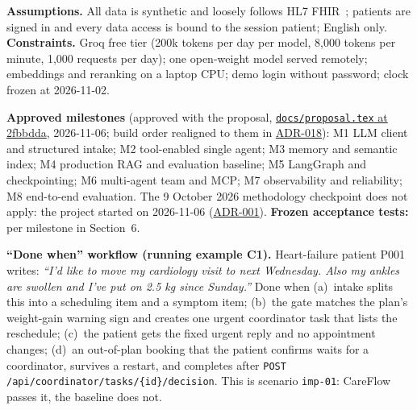 \documentclass[10pt,a4paper]{article}
\newcommand{\repourl}{https://github.com/saideepaksana/careflow}
\newcommand{\rev}{cs5903-final-2026}
\newcommand{\adr}[1]{\href{\repourl/blob/\rev/docs/Architecture_Decision_Records.md}{ADR-#1}}
\newcommand{\cmd}[1]{\nolinkurl{#1}}
\begin{document}
\textbf{Assumptions.} All data is synthetic and loosely follows HL7 FHIR~\cite{fhir}; patients are signed in and every data access is bound to the session patient; English only. \textbf{Constraints.} Groq free tier (200k tokens per day per model, 8,000 tokens per minute, 1,000 requests per day); one open-weight model served remotely; embeddings and reranking on a laptop CPU; demo login without password; clock frozen at 2026-11-02.

\textbf{Approved milestones} (approved with the proposal, \href{\repourl/blob/2fbbdda/docs/proposal.tex}{\nolinkurl{docs/proposal.tex} at 2fbbdda}, 2026-11-06; build order realigned to them in \adr{018}): M1 LLM client and structured intake; M2 tool-enabled single agent; M3 memory and semantic index; M4 production RAG and evaluation baseline; M5 LangGraph and checkpointing; M6 multi-agent team and MCP; M7 observability and reliability; M8 end-to-end evaluation. The 9 October 2026 methodology checkpoint does not apply: the project started on 2026-11-06 (\adr{001}). \textbf{Frozen acceptance tests:} per milestone in Section~6.

\textbf{``Done when'' workflow (running example C1).} Heart-failure patient P001 writes: \emph{``I'd like to move my cardiology visit to next Wednesday. Also my ankles are swollen and I've put on 2.5 kg since Sunday.''} Done when (a)~intake splits this into a scheduling item and a symptom item; (b)~the gate matches the plan's weight-gain warning sign and creates one urgent coordinator task that lists the reschedule; (c)~the patient gets the fixed urgent reply and no appointment changes; (d)~an out-of-plan booking that the patient confirms waits for a coordinator, survives a restart, and completes after \cmd{POST /api/coordinator/tasks/{id}/decision}. This is scenario \texttt{imp-01}: CareFlow passes it, the baseline does not.
\end{document}
